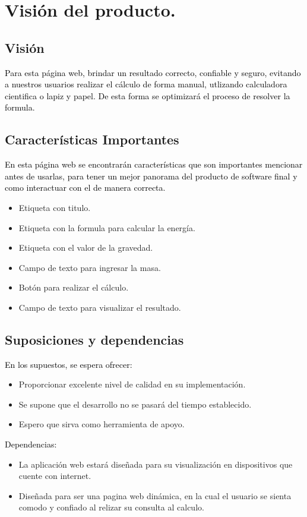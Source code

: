 \documentclass[10pt]{article} %
\begin{document}
\section{Visión del producto.} 
\newline
\newline

\subsection*{Visión}

 
\textcolor{black}{Para esta página web, brindar un resultado correcto, confiable y seguro, evitando a nuestros usuarios realizar el cálculo de forma manual, utlizando calculadora cientifica o lapiz y papel. De esta forma se optimizará el proceso de resolver la formula.} 


 
\subsection*{Características Importantes}

 
 \textcolor{black}{En esta página web se encontrarán características que son importantes mencionar antes de usarlas, para tener un mejor panorama del producto de software final y como interactuar con el de manera correcta.}
 \begin{itemize}
    \item Etiqueta con titulo.
    \item Etiqueta con la formula para calcular la energía.
    \item Etiqueta con el valor de la gravedad.
    \item Campo de texto para ingresar la masa.
    \item Botón para realizar el cálculo.
    \item Campo de texto para visualizar el resultado.
\end{itemize}

\subsection*{Suposiciones y dependencias}
\textcolor{black}{En los supuestos, se espera ofrecer:}
\begin{itemize}
    \item Proporcionar excelente nivel de calidad en su implementación.
    \item Se supone que el desarrollo no se pasará del tiempo establecido.
    \item Espero que sirva como herramienta de apoyo. 
\end{itemize}
\textcolor{black}{Dependencias:}
\begin{itemize}
    \item La aplicación web estará diseñada para su visualización en dispositivos que cuente con internet.
    \item Diseñada para ser una pagina web dinámica, en la cual el usuario se sienta comodo y confiado al relizar su consulta al calculo.
\end{itemize}
 

 
\end{document}

